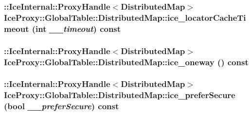 \label{class_ice_proxy_1_1_global_table_1_1_distributed_map_a2948cd5ff5bda870a2d0240e6cfacb13}
\hypertarget{class_ice_proxy_1_1_global_table_1_1_distributed_map_a033996fef1b3d4c99cfe0a31ecf7ed14}{
\subsubsection[{ice\_\-locatorCacheTimeout}]{\setlength{\rightskip}{0pt plus 5cm}::IceInternal::ProxyHandle$<${\bf DistributedMap}$>$ IceProxy::GlobalTable::DistributedMap::ice\_\-locatorCacheTimeout (int {\em \_\-\_\-timeout}) const}}
\label{class_ice_proxy_1_1_global_table_1_1_distributed_map_a033996fef1b3d4c99cfe0a31ecf7ed14}
\hypertarget{class_ice_proxy_1_1_global_table_1_1_distributed_map_a761c30883bdab01e4be04792354110c6}{
\subsubsection[{ice\_\-oneway}]{\setlength{\rightskip}{0pt plus 5cm}::IceInternal::ProxyHandle$<${\bf DistributedMap}$>$ IceProxy::GlobalTable::DistributedMap::ice\_\-oneway () const}}
\label{class_ice_proxy_1_1_global_table_1_1_distributed_map_a761c30883bdab01e4be04792354110c6}
\hypertarget{class_ice_proxy_1_1_global_table_1_1_distributed_map_a17d4cae6d12bf2e32780b75ad44e3bc1}{
\subsubsection[{ice\_\-preferSecure}]{\setlength{\rightskip}{0pt plus 5cm}::IceInternal::ProxyHandle$<${\bf DistributedMap}$>$ IceProxy::GlobalTable::DistributedMap::ice\_\-preferSecure (bool {\em \_\-\_\-preferSecure}) const}}
